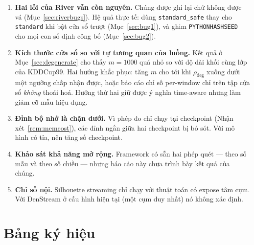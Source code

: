 \documentclass[11pt,a4paper]{article}
\theoremstyle{remark}
\begin{document}
\begin{enumerate}
  \item \textbf{Hai lỗi của River vẫn còn nguyên.} Chúng được ghi lại chứ không
        được vá (Mục~\ref{sec:riverbugs}). Hệ quả thực tế: dùng
        \texttt{standard\_safe} thay cho \texttt{standard} khi bật cửa sổ trượt
        (Mục~\ref{sec:bug1}), và ghim \texttt{PYTHONHASHSEED} cho mọi con số
        định công bố (Mục~\ref{sec:bug2}).

  \item \textbf{Kích thước cửa sổ so với tự tương quan của luồng.} Kết quả ở
        Mục~\ref{sec:degenerate} cho thấy $m=1000$ quá nhỏ so với độ dài khối
        cùng lớp của KDDCup99. Hai hướng khắc phục: tăng $m$ cho tới khi
        $\rho_{\text{deg}}$ xuống dưới một ngưỡng chấp nhận được, hoặc báo cáo
        chỉ số per-window chỉ trên tập cửa sổ \emph{không} thoái hoá. Hướng thứ
        hai giữ được ý nghĩa time-aware nhưng làm giảm cỡ mẫu hiệu dụng.

  \item \textbf{Đỉnh bộ nhớ là chặn dưới.} Vì phép đo chỉ chạy tại checkpoint
        (Nhận xét~\ref{rem:memcost}), các đỉnh ngắn giữa hai checkpoint bị bỏ
        sót. Với mô hình có tỉa, nên tăng số checkpoint.

  \item \textbf{Khảo sát khả năng mở rộng.} Framework có sẵn hai phép quét ---
        theo số mẫu và theo số chiều --- nhưng báo cáo này chưa trình bày kết
        quả của chúng.

  \item \textbf{Chỉ số nội.} Silhouette streaming chỉ chạy với thuật toán có
        expose tâm cụm. Với DenStream ở cấu hình hiện tại (một cụm duy nhất) nó
        không xác định.
\end{enumerate}

\appendix
\section{Bảng ký hiệu}
\end{document}
